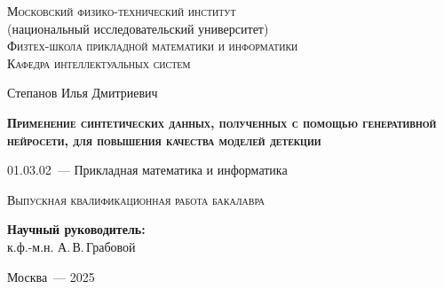 \thispagestyle{empty}

\begin{titlepage}
    \begin{center}
        \textsc{Московский физико-технический институт}\\
        (национальный исследовательский университет)\\
        \textsc{Физтех-школа прикладной математики и информатики}\\
        \textsc{Кафедра интеллектуальных систем}
        \end{center}
        \vspace{2.5cm}
        \begin{center}
        {Степанов Илья Дмитриевич}
        \par
        \vspace{2cm}
        {\Large \textsc{\textbf{Применение синтетических данных, полученных с помощью генеративной нейросети, для повышения качества моделей детекции}}}
        \par
        \vspace{2cm}
        {01.03.02~--- Прикладная математика и информатика}
        \par
        \vspace{2cm}
        \textsc{Выпускная квалификационная работа бакалавра}
        \end{center}
        \vspace{2cm}
        \hfill\parbox{8,4cm}{\textbf{Научный руководитель:}
        \\к.ф.-м.н. А.\,В.\,Грабовой}
        \par
        \vspace{2.5cm}
        \begin{center}
        {Москва~--- 2025}
    \end{center}
\end{titlepage}